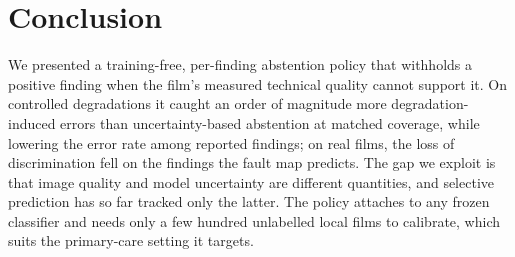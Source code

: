 \documentclass[conference]{IEEEtran}
\begin{document}
\section{Conclusion}
We presented a training-free, per-finding abstention policy that withholds a
positive finding when the film's measured technical quality cannot support it.
On controlled degradations it caught an order of magnitude more
degradation-induced errors than uncertainty-based abstention at matched
coverage, while lowering the error rate among reported findings; on real films,
the loss of discrimination fell on the findings the fault map predicts. The gap
we exploit is that image quality and model uncertainty are different quantities,
and selective prediction has so far tracked only the latter. The policy attaches
to any frozen classifier and needs only a few hundred unlabelled local films to
calibrate, which suits the primary-care setting it targets.



\end{document}
